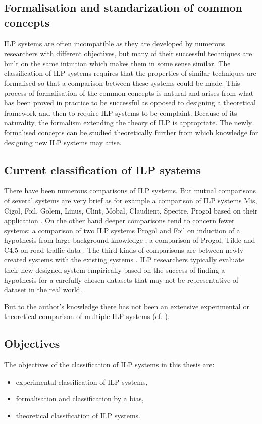 \subsection{Formalisation and standarization of common concepts}
ILP systems are often incompatible as they are developed by numerous researchers with different objectives, but many of their successful techniques are built on the same intuition which makes them in some sense similar. The classification of ILP systems requires that the properties of similar techniques are formalised so that a comparison between these systems could be made. This process of formalisation of the common concepts is natural and arises from what has been proved in practice to be successful as opposed to designing a theoretical framework and then to require ILP systems to be complaint. Because of its naturality, the formalism extending the theory of ILP is appropriate. The newly formalised concepts can be studied theoretically further from which knowledge for designing new ILP systems may arise.

\subsection{Current classification of ILP systems}
There have been numerous comparisons of ILP systems. But mutual comparisons of several systems are very brief as for example a comparison of ILP systems Mis, Cigol, Foil, Golem, Linus, Clint, Mobal, Claudient, Spectre, Progol based on their application \cite{nienhuys1997foundations}.
On the other hand deeper comparisons tend to concern fewer systems: 
a comparison of two ILP systems Progol and Foil on induction of a hypothesis from  large background knowledge \cite{srinivasan1995comparing},
a comparison of Progol, Tilde and C4.5 on road traffic data \cite{roberts1998comparison}. The third kinds of comparisons are between newly created systems with the existing systems \cite{muggleton2012mc} \cite{corapi2011nonmonotonic}.
ILP researchers typically evaluate their new designed system empirically based on the success of finding a hypothesis for a carefully chosen datasets that may not be representative of dataset in the real world.

But to the author's knowledge there has not been an extensive experimental or theoretical comparison of multiple ILP systems (cf. ). 

\subsection{Objectives}
The objectives of the classification of ILP systems in this thesis are:
\begin{itemize}
\item experimental classification of ILP systems,
\item formalisation and classification by a bias,
\item theoretical classification of ILP systems.
\end{itemize}

